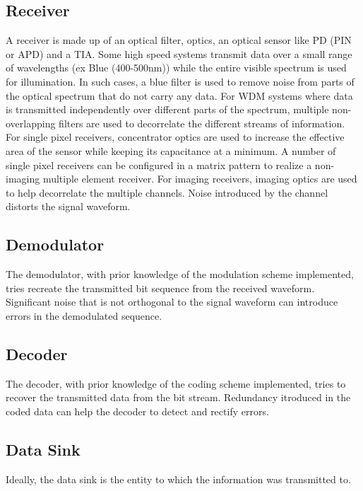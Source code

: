 \subsection{Receiver}
\label{subsec:outlineReceiver}
A receiver is made up of an optical filter, optics, an optical sensor like PD (PIN or APD) and a TIA. Some high speed systems transmit data over a small range of wavelengths (ex Blue (400-500nm)) while the entire visible spectrum is used for illumination. In such cases, a blue filter is used to remove noise from parts of the optical spectrum that do not carry any data. For WDM systems where data is transmitted independently over different parts of the spectrum, multiple non-overlapping filters are used to decorrelate the different streams of information. For single pixel receivers, concentrator optics are used to increase the effective area of the sensor while keeping its capacitance at a minimum. A number of single pixel receivers can be configured in a matrix pattern to realize a non-imaging multiple element receiver. For imaging receivers, imaging optics are used to help decorrelate the multiple channels. Noise introduced by the channel distorts the signal waveform. 

\subsection{Demodulator}
\label{subsec:outlineDemodulator}
The demodulator, with prior knowledge of the modulation scheme implemented, tries recreate the transmitted bit sequence from the received waveform. Significant noise that is not orthogonal to the signal waveform can introduce errors in the demodulated sequence.

\subsection{Decoder}
\label{subsec:outlineDecoder}
The decoder, with prior knowledge of the coding scheme implemented, tries to recover the transmitted data from the bit stream. Redundancy itroduced in the coded data can help the decoder to detect and rectify errors.

\subsection{Data Sink}
\label{subsec:outlineSink}
Ideally, the data sink is the entity to which the information was transmitted to. 
